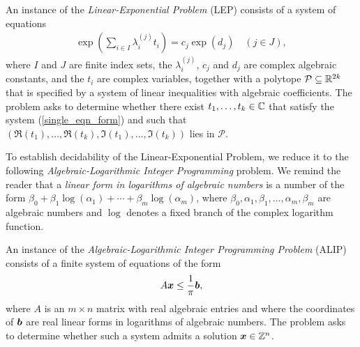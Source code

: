 \begin{definition}
  An instance of the \emph{Linear-Exponential Problem} (LEP) consists of a system
  of equations
\begin{align}
\label{single_eqn_form}
  \exp\left(\sum_{i \in I} \lambda_i^{(j)} t_i \right) = c_j \exp (d_j)
\quad (j \in J),
\end{align}
where $I$ and $J$ are finite index sets, the $\lambda_i^{(j)}$, $c_j$
and $d_j$ are complex algebraic constants, and the $t_i$ are complex
variables, together with a polytope
$\mathcal{P} \subseteq \mathbb{R}^{2k}$ that is specified by a system
of linear inequalities with algebraic coefficients.  The problem asks
to determine whether there exist $t_1,\ldots,t_k\in \mathbb{C}$ that
satisfy the system (\ref{single_eqn_form}) and such that
$(\Re(t_1),\ldots,\Re(t_k),\Im(t_1),\ldots,\Im(t_k))$
lies in $\mathcal{P}$.
\label{def:LEP}
\end{definition}

To establish decidability of the Linear-Exponential Problem, we reduce
it to the following
\emph{Algebraic-Logarithmic Integer Programming}
problem.  We remind the reader that a \emph{linear form in logarithms of algebraic numbers}
is a number of the form
$\beta_{0} + \beta_{1} \log(\alpha_{1}) + \cdots + \beta_{m}
\log(\alpha_{m})$,
where
$\beta_{0}, \alpha_{1}, \beta_{1}, \ldots, \alpha_{m}, \beta_{m}$ are
algebraic numbers and $\log$ denotes a fixed branch of the complex
logarithm function.



\begin{definition}
An instance of the \emph{Algebraic-Logarithmic Integer Programming Problem} (ALIP) consists of a finite system of equations of the form
\begin{align*}
A \boldsymbol{x} \leq \frac{1}{\pi} \boldsymbol{b},
\end{align*}
where $A$ is an $m\times n$ matrix with real algebraic entries and
where the coordinates of $\boldsymbol{b}$ are real linear forms in
logarithms of algebraic numbers. The problem asks to determine whether
such a system admits a solution $\boldsymbol{x} \in \mathbb{Z}^{n}$.
\end{definition}


